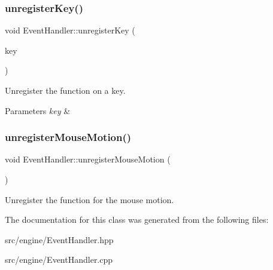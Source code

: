 \subsubsection{\texorpdfstring{unregisterKey()}{unregisterKey()}}
{\footnotesize\ttfamily void Event\+Handler\+::unregister\+Key (\begin{DoxyParamCaption}\item[{S\+D\+L\+\_\+\+Scancode}]{key }\end{DoxyParamCaption})}



Unregister the function on a key. 


\begin{DoxyParams}{Parameters}
{\em key} & \\
\hline
\end{DoxyParams}
\mbox{\label{classEventHandler_a8907091f20fddc7a4a94ab994902aea7}} 
\subsubsection{\texorpdfstring{unregisterMouseMotion()}{unregisterMouseMotion()}}
{\footnotesize\ttfamily void Event\+Handler\+::unregister\+Mouse\+Motion (\begin{DoxyParamCaption}{ }\end{DoxyParamCaption})}



Unregister the function for the mouse motion. 



The documentation for this class was generated from the following files\+:\begin{DoxyCompactItemize}
\item 
src/engine/Event\+Handler.\+hpp\item 
src/engine/Event\+Handler.\+cpp\end{DoxyCompactItemize}
